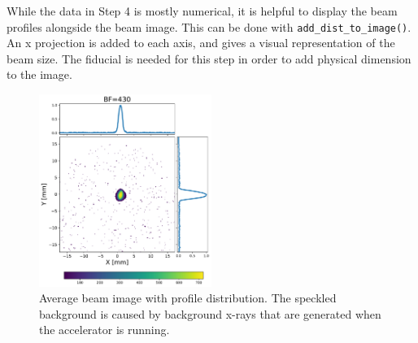 While the data in Step 4 is mostly numerical, it is helpful to 
display the beam profiles alongside the beam image. 
This can be done with \verb|add_dist_to_image()|. 
An x projection is added to each axis,  and gives a visual representation of the beam size. 
The fiducial is needed for this step in order to add physical dimension to the image.
\begin{figure}
	\centering
	\includegraphics[width=0.5\textwidth]{images/yag1_1nC_M260_BF430}
	\caption{Average beam image with profile distribution.
	The speckled background is caused by background x-rays that are 
	generated when the accelerator is running.}
\end{figure}


